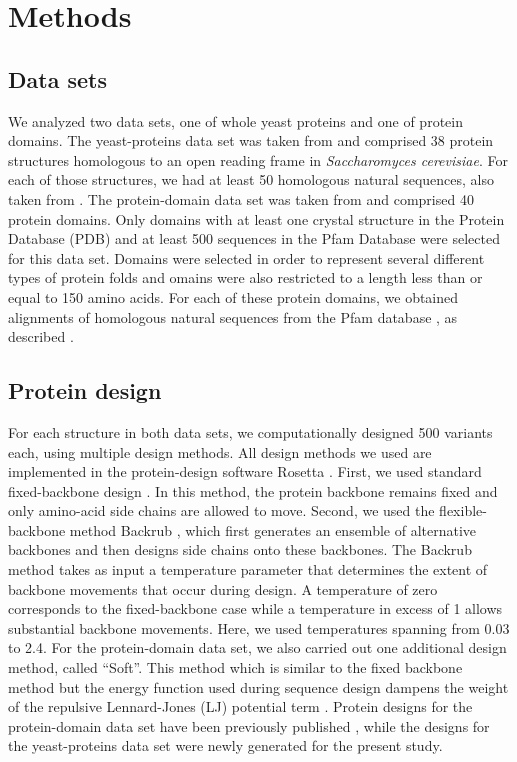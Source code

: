 \documentclass[12pt]{article}
\begin{document}
\section{Methods}
\label{Methods}

\subsection{Data sets}

We analyzed two data sets, one of whole yeast proteins and one of protein domains. The yeast-proteins data set was taken from \citet{Ramsey2011} and comprised 38 protein structures homologous to an open reading frame in \emph{Saccharomyces cerevisiae}. For each of those structures, we had at least 50 homologous natural sequences, also taken from  \citet{Ramsey2011}. The protein-domain data set was taken from \citet{OllikainenKortemme} and comprised 40 protein domains. Only domains with at least one crystal structure in the Protein Database (PDB) and at least 500 sequences in the Pfam Database were selected for this data set. Domains were selected in order to represent several different types of protein folds and omains were also restricted to a length less than or equal to 150 amino acids. For each of these protein domains, we obtained alignments of homologous natural sequences from the Pfam database \citep{Pfam}, as described \citep{OllikainenKortemme}.

\subsection{Protein design}

For each structure in both data sets, we computationally designed 500 variants each, using multiple design methods. All design methods we used are implemented in the protein-design software Rosetta \citep{LeaverFayetal2011}. First, we used standard fixed-backbone design \citep{fixed-design}. In this method, the protein backbone remains fixed and only amino-acid side chains are allowed to move. Second, we used the flexible-backbone method Backrub \citep{Smith2008}, which first generates an ensemble of alternative backbones and then designs side chains onto these backbones. The Backrub method takes as input a temperature parameter that determines the extent of backbone movements that occur during design. A temperature of zero corresponds to the fixed-backbone case while a temperature in excess of 1 allows substantial backbone movements. Here, we used temperatures spanning from 0.03 to 2.4. For the protein-domain data set, we also carried out one additional design method, called ``Soft''. This method which is similar to the fixed backbone method but the energy function used during sequence design dampens the weight of the repulsive Lennard-Jones (LJ) potential term \citep{OllikainenKortemme}.  Protein designs for the protein-domain data set have been previously published \citep{OllikainenKortemme}, while the designs for the yeast-proteins data set were newly generated for the present study.
\end{document}
